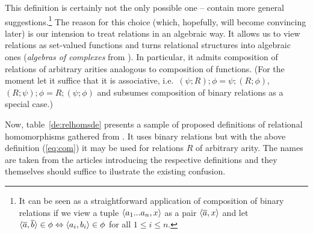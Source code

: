 \documentclass[10pt]{article}
\begin{document}
%
This definition is certainly not the only possible one -- \cite{Topen:93, glenn}
contain more general suggestions.\footnote{It
can be seen as a straightforward application of composition of binary
relations if we view a tuple $\langle a_1...a_n,x\rangle$ as a pair $\langle\overline {a},x\rangle$ and let $\langle\overline {a},\overline {b}\rangle\in\phi \Leftrightarrow \langle a_i,b_i\rangle\in\phi$ for
all $1\leq i\leq n$.}  The reason for this choice (which, hopefully,
will become convincing later) is our intension to treat relations in
an algebraic way. 
It allows us to view relations as set-valued functions and turns
relational structures into algebraic ones
({\em algebras of complexes} from \cite{JT1,JT2}). In particular, it admits
composition of relations of arbitrary
arities analogous to composition of functions. (For the moment let
it suffice that it is associative, i.e.\
$(\psi;R);\phi=\psi;(R;\phi)$, $(R;\psi);\phi=R;(\psi;\phi)$ and
subsumes composition of binary relations as a special case.)

Now, table~\ref{de:relhomsde} presents
a sample of proposed definitions of relational homomorphisms gathered from 
\cite{Most,Gratzer,Cohn,Los:relhoms,Pattison,relhoms,c:93,c:94}. It uses binary
relations but with the above definition (\ref{eq:com}) it may be used for relations
$R$ of arbitrary arity.
The names are taken from the articles introducing the respective
definitions and they themselves should suffice to ilustrate the
existing confusion.  
\end{document}
